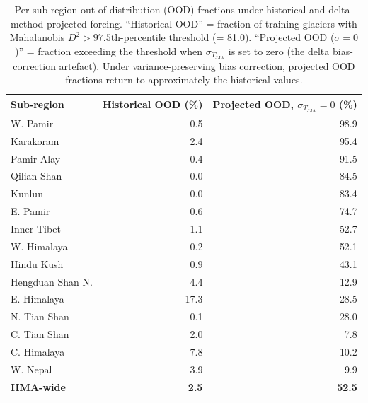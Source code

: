 \begin{table}[htbp]
\centering
\caption{Per-sub-region out-of-distribution (OOD) fractions under historical and delta-method projected forcing.
``Historical OOD'' = fraction of training glaciers with Mahalanobis $D^2 > 97.5$th-percentile threshold (= 81.0).
``Projected OOD ($\sigma=0$)'' = fraction exceeding the threshold when $\sigma_{T_\text{JJA}}$ is set to zero
(the delta bias-correction artefact). Under variance-preserving bias correction, projected OOD fractions
return to approximately the historical values.}
\label{tab:S1_proj_ood}
\begin{tabular}{lrr}
\hline
Sub-region & Historical OOD (\%) & Projected OOD, $\sigma_{T_\text{JJA}}=0$ (\%) \\
\hline
W. Pamir         & 0.5  & 98.9 \\
Karakoram        & 2.4  & 95.4 \\
Pamir-Alay       & 0.4  & 91.5 \\
Qilian Shan      & 0.0  & 84.5 \\
Kunlun           & 0.0  & 83.4 \\
E. Pamir         & 0.6  & 74.7 \\
Inner Tibet      & 1.1  & 52.7 \\
W. Himalaya      & 0.2  & 52.1 \\
Hindu Kush       & 0.9  & 43.1 \\
Hengduan Shan N. & 4.4  & 12.9 \\
E. Himalaya      & 17.3 & 28.5 \\
N. Tian Shan     & 0.1  & 28.0 \\
C. Tian Shan     & 2.0  &  7.8 \\
C. Himalaya      & 7.8  & 10.2 \\
W. Nepal         & 3.9  &  9.9 \\
\hline
\textbf{HMA-wide} & \textbf{2.5} & \textbf{52.5} \\
\hline
\end{tabular}
\end{table}
